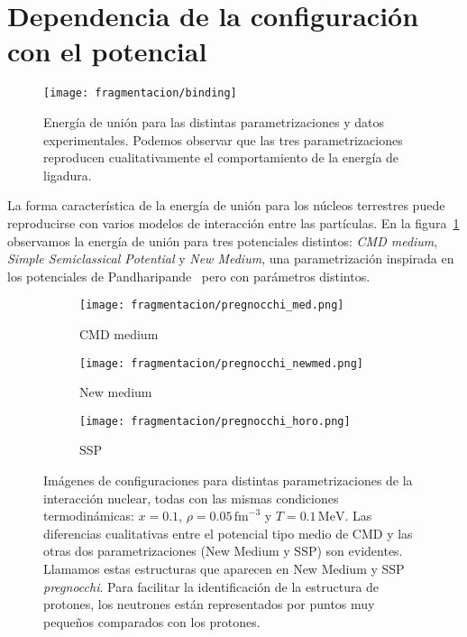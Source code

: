 \section{Dependencia de la configuración con el potencial}

\begin{figure} \centering
  \texttt{[image: fragmentacion/binding]}
  \caption{Energía de unión para las distintas parametrizaciones y datos experimentales.
    Podemos observar que las tres parametrizaciones reproducen cualitativamente el comportamiento de la energía de ligadura.}
  \label{fig:binding}
\end{figure}
La forma característica de la energía de unión para los núcleos terrestres puede reproducirse con varios modelos de interacción entre las partículas.
En la figura~\ref{fig:binding} observamos la energía de unión para tres potenciales distintos: \emph{CMD medium}, \emph{Simple Semiclassical Potential} y \emph{New Medium}, una parametrización inspirada en los potenciales de Pandharipande~\cite{akmal_equation_1998} pero con parámetros distintos.

\begin{figure*}
  \begin{subfigure}{.3\linewidth}
    \texttt{[image: fragmentacion/pregnocchi\_med.png]}
    \caption{CMD medium}
  \end{subfigure}
  \begin{subfigure}{.3\linewidth}
    \texttt{[image: fragmentacion/pregnocchi\_newmed.png]}
    \caption{New medium}
  \end{subfigure}
  \begin{subfigure}{.3\linewidth}
    \texttt{[image: fragmentacion/pregnocchi\_horo.png]}
    \caption{SSP}
  \end{subfigure}
  \caption{Imágenes de configuraciones para distintas parametrizaciones de la interacción nuclear, todas con las mismas condiciones termodinámicas: $x = 0.1$, $\rho = 0.05\,\text{fm}^{-3}$ y $T = 0.1\,\text{MeV}$.
    Las diferencias cualitativas entre el potencial tipo medio de CMD y las otras dos parametrizaciones (New Medium y SSP) son evidentes.
    Llamamos estas estructuras que aparecen en New Medium y SSP \emph{pregnocchi}.
    Para facilitar la identificación de la estructura de protones, los neutrones están representados por puntos muy pequeños comparados con los protones.}
\label{fig:x01_potentials}
\end{figure*}

